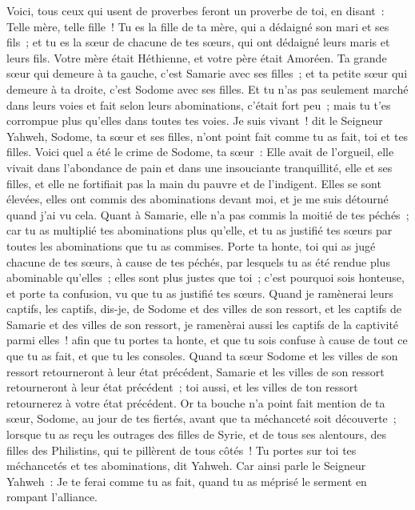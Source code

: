 \begin{multicols}{2}
Voici, tous ceux qui usent de proverbes feront un proverbe de toi, en disant~: Telle mère, telle fille~!
Tu es la fille de ta mère, qui a dédaigné son mari et ses fils~; et tu es la sœur de chacune de tes sœurs, qui ont dédaigné leurs maris et leurs fils. Votre mère était Héthienne, et votre père était Amoréen.
Ta grande sœur qui demeure à ta gauche, c'est Samarie avec ses filles~; et ta petite sœur qui demeure à ta droite, c'est Sodome avec ses filles.
Et tu n'as pas seulement marché dans leurs voies et fait selon leurs abominations, c'était fort peu~; mais tu t'es corrompue plus qu'elles dans toutes tes voies.
Je suis vivant~! dit le Seigneur Yahweh, Sodome, ta sœur et ses filles, n'ont point fait comme tu as fait, toi et tes filles.
Voici quel a été le crime de Sodome, ta sœur~: Elle avait de l'orgueil, elle vivait dans l'abondance de pain et dans une insouciante tranquillité, elle et ses filles, et elle ne fortifiait pas la main du pauvre et de l'indigent.
Elles se sont élevées, elles ont commis des abominations devant moi, et je me suis détourné quand j'ai vu cela.
Quant à Samarie, elle n'a pas commis la moitié de tes péchés~; car tu as multiplié tes abominations plus qu'elle, et tu as justifié tes sœurs par toutes les abominations que tu as commises.
Porte ta honte, toi qui as jugé chacune de tes sœurs, à cause de tes péchés, par lesquels tu as été rendue plus abominable qu'elles~; elles sont plus justes que toi~; c'est pourquoi sois honteuse, et porte ta confusion, vu que tu as justifié tes sœurs.
Quand je ramènerai leurs captifs, les captifs, dis-je, de Sodome et des villes de son ressort, et les captifs de Samarie et des villes de son ressort, je ramenèrai aussi les captifs de la captivité parmi elles~!
afin que tu portes ta honte, et que tu sois confuse à cause de tout ce que tu as fait, et que tu les consoles.
Quand ta sœur Sodome et les villes de son ressort retourneront à leur état précédent, Samarie et les villes de son ressort retourneront à leur état précédent~; toi aussi, et les villes de ton ressort retournerez à votre état précédent.
Or ta bouche n'a point fait mention de ta sœur, Sodome, au jour de tes fiertés,
avant que ta méchanceté soit découverte~; lorsque tu as reçu les outrages des filles de Syrie, et de tous ses alentours, des filles des Philistins, qui te pillèrent de tous côtés~!
Tu portes sur toi tes méchancetés et tes abominations, dit Yahweh.
Car ainsi parle le Seigneur Yahweh~: Je te ferai comme tu as fait, quand tu as méprisé le serment en rompant l'alliance.

\end{multicols}
